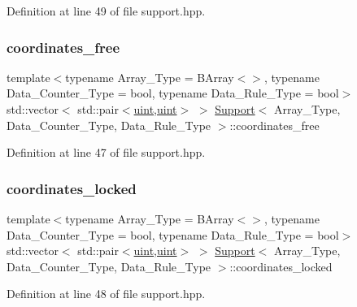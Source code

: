 Definition at line 49 of file support.\+hpp.

\mbox{\label{class_support_a36f6685c1f22eeca1919dfbb0ff4cb54}} 
\subsubsection{\texorpdfstring{coordinates\+\_\+free}{coordinates\_free}}
{\footnotesize\ttfamily template$<$typename Array\+\_\+\+Type = B\+Array$<$$>$, typename Data\+\_\+\+Counter\+\_\+\+Type = bool, typename Data\+\_\+\+Rule\+\_\+\+Type = bool$>$ \\
std\+::vector$<$ std\+::pair$<$\hyperlink{typedefs_8hpp_a91ad9478d81a7aaf2593e8d9c3d06a14}{uint},\hyperlink{typedefs_8hpp_a91ad9478d81a7aaf2593e8d9c3d06a14}{uint}$>$ $>$ \hyperlink{class_support}{Support}$<$ Array\+\_\+\+Type, Data\+\_\+\+Counter\+\_\+\+Type, Data\+\_\+\+Rule\+\_\+\+Type $>$\+::coordinates\+\_\+free}



Definition at line 47 of file support.\+hpp.

\mbox{\label{class_support_ab740de5d3497a4bf51cddb256f85cd72}} 
\subsubsection{\texorpdfstring{coordinates\+\_\+locked}{coordinates\_locked}}
{\footnotesize\ttfamily template$<$typename Array\+\_\+\+Type = B\+Array$<$$>$, typename Data\+\_\+\+Counter\+\_\+\+Type = bool, typename Data\+\_\+\+Rule\+\_\+\+Type = bool$>$ \\
std\+::vector$<$ std\+::pair$<$\hyperlink{typedefs_8hpp_a91ad9478d81a7aaf2593e8d9c3d06a14}{uint},\hyperlink{typedefs_8hpp_a91ad9478d81a7aaf2593e8d9c3d06a14}{uint}$>$ $>$ \hyperlink{class_support}{Support}$<$ Array\+\_\+\+Type, Data\+\_\+\+Counter\+\_\+\+Type, Data\+\_\+\+Rule\+\_\+\+Type $>$\+::coordinates\+\_\+locked}



Definition at line 48 of file support.\+hpp.

\mbox{\label{class_support_a518268efc16cef68aa2211089c822c03}} 
